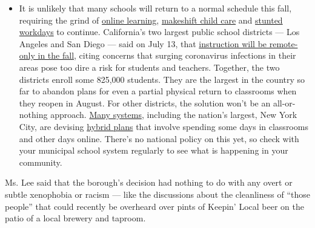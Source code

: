 \begin{itemize}
  \begin{itemize}
  \tightlist
  \item
    It is unlikely that many schools will return to a normal schedule
    this fall, requiring the grind of
    \href{https://www.nytimes.com/2020/06/05/us/coronavirus-education-lost-learning.html?action=click\&pgtype=Article\&state=default\&region=MAIN_CONTENT_3\&context=storylines_faq}{online
    learning},
    \href{https://www.nytimes.com/2020/05/29/us/coronavirus-child-care-centers.html?action=click\&pgtype=Article\&state=default\&region=MAIN_CONTENT_3\&context=storylines_faq}{makeshift
    child care} and
    \href{https://www.nytimes.com/2020/06/03/business/economy/coronavirus-working-women.html?action=click\&pgtype=Article\&state=default\&region=MAIN_CONTENT_3\&context=storylines_faq}{stunted
    workdays} to continue. California's two largest public school
    districts --- Los Angeles and San Diego --- said on July 13, that
    \href{https://www.nytimes.com/2020/07/13/us/lausd-san-diego-school-reopening.html?action=click\&pgtype=Article\&state=default\&region=MAIN_CONTENT_3\&context=storylines_faq}{instruction
    will be remote-only in the fall}, citing concerns that surging
    coronavirus infections in their areas pose too dire a risk for
    students and teachers. Together, the two districts enroll some
    825,000 students. They are the largest in the country so far to
    abandon plans for even a partial physical return to classrooms when
    they reopen in August. For other districts, the solution won't be an
    all-or-nothing approach.
    \href{https://bioethics.jhu.edu/research-and-outreach/projects/eschool-initiative/school-policy-tracker/}{Many
    systems}, including the nation's largest, New York City, are
    devising
    \href{https://www.nytimes.com/2020/06/26/us/coronavirus-schools-reopen-fall.html?action=click\&pgtype=Article\&state=default\&region=MAIN_CONTENT_3\&context=storylines_faq}{hybrid
    plans} that involve spending some days in classrooms and other days
    online. There's no national policy on this yet, so check with your
    municipal school system regularly to see what is happening in your
    community.
  \end{itemize}
\end{itemize}

Ms. Lee said that the borough's decision had nothing to do with any
overt or subtle xenophobia or racism --- like the discussions about the
cleanliness of ``those people'' that could recently be overheard over
pints of Keepin' Local beer on the patio of a local brewery and taproom.

